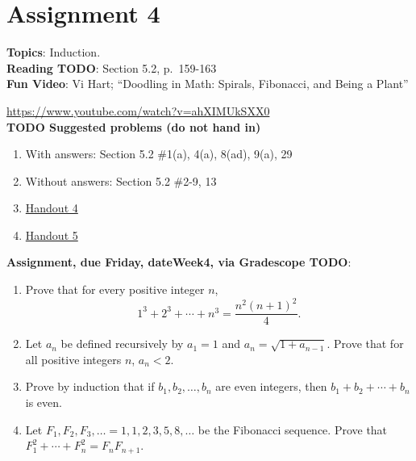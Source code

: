 \documentclass[12pt]{article}
\begin{document}
\newpage
\section[4 (due \csname dateWeek4\endcsname): Induction.]{Assignment 4}

\textbf{Topics}: Induction.
\\

\noindent \textbf{Reading TODO}: Section 5.2, p.~159-163
\\

\noindent \textbf{Fun Video}: Vi Hart; ``Doodling in Math: Spirals, Fibonacci, and Being a Plant''

\noindent \url{https://www.youtube.com/watch?v=ahXIMUkSXX0}
\\ 

\noindent \textbf{TODO Suggested problems (do not hand in)}

\begin{enumerate}
\item With answers: Section 5.2 \#1(a), 4(a), 8(ad), 9(a), 29
\item Without answers: Section 5.2 \#2-9, 13
\item \href{https://www.math.emory.edu/~dzb/teaching/250Fall2021/handouts/250-H04-induction-warmup.pdf}{Handout 4}
\item \href{https://www.math.emory.edu/~dzb/teaching/250Fall2021/handouts/250-H05-induction-problems.pdf}{Handout 5}
\end{enumerate}

\noindent \textbf{Assignment, due Friday, \csname dateWeek4\endcsname, via Gradescope TODO}:
\begin{enumerate}
\item Prove that for every positive integer $n$,
 $$1^3 + 2^3 + \cdots +n^3 = \frac{n^2(n+1)^2}{4}.$$ 
\item Let $a_n$ be defined recursively by $a_1 = 1$ and $a_n = \sqrt{1 + a_{n-1}}$. Prove that for all positive integers $n$, $a_n < 2$.
\item Prove by induction that if $b_1, b_2, \ldots , b_n$ are even integers, then $b_1 + b_2 + \cdots + b_n$ is even.
 \item Let $F_1, F_2, F_3, \ldots = 1,1,2,3,5,8,\ldots$ be the Fibonacci sequence. Prove that $F_1^2 + \cdots + F_n^2 = F_nF_{n+1}$.
 \end{enumerate}
\end{document}
